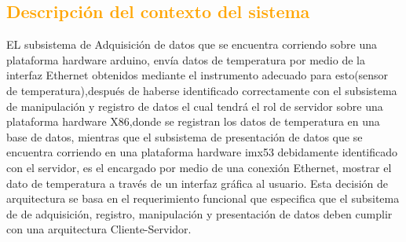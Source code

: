 \subsection{\textcolor{orange}{Descripción del contexto del sistema}}

EL subsistema de Adquisición  de datos que se encuentra corriendo sobre una plataforma hardware arduino, envía datos de temperatura por medio de la interfaz Ethernet obtenidos mediante el instrumento adecuado para esto(sensor de temperatura),después de haberse identificado correctamente con el subsistema de manipulación y registro de datos el cual tendrá el rol de servidor sobre una plataforma hardware X86,donde se registran los datos de temperatura en una base de datos, mientras que el subsistema de presentación de datos que se encuentra corriendo en una plataforma hardware imx53 debidamente identificado con el servidor, es el encargado por medio de una conexión Ethernet, mostrar el dato de temperatura a través de un interfaz gráfica al usuario. 
Esta decisión de arquitectura se basa en el requerimiento funcional que especifica que el subsitema de de adquisición, registro, manipulación y presentación de datos  deben cumplir con una arquitectura Cliente-Servidor. 

\newpage

